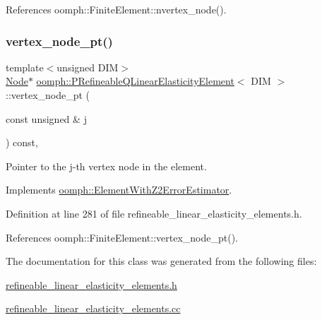 References oomph\+::\+Finite\+Element\+::nvertex\+\_\+node().

\mbox{\label{classoomph_1_1PRefineableQLinearElasticityElement_a0d55b987133d2b9a2f8be959e33ab7eb}} 
\subsubsection{\texorpdfstring{vertex\+\_\+node\+\_\+pt()}{vertex\_node\_pt()}}
{\footnotesize\ttfamily template$<$unsigned D\+IM$>$ \\
\hyperlink{classoomph_1_1Node}{Node}$\ast$ \hyperlink{classoomph_1_1PRefineableQLinearElasticityElement}{oomph\+::\+P\+Refineable\+Q\+Linear\+Elasticity\+Element}$<$ D\+IM $>$\+::vertex\+\_\+node\+\_\+pt (\begin{DoxyParamCaption}\item[{const unsigned \&}]{j }\end{DoxyParamCaption}) const\hspace{0.3cm}{\ttfamily [inline]}, {\ttfamily [virtual]}}



Pointer to the j-\/th vertex node in the element. 



Implements \hyperlink{classoomph_1_1ElementWithZ2ErrorEstimator_a0eedccc33519f852c5dc2055ddf2774b}{oomph\+::\+Element\+With\+Z2\+Error\+Estimator}.



Definition at line 281 of file refineable\+\_\+linear\+\_\+elasticity\+\_\+elements.\+h.



References oomph\+::\+Finite\+Element\+::vertex\+\_\+node\+\_\+pt().



The documentation for this class was generated from the following files\+:\begin{DoxyCompactItemize}
\item 
\hyperlink{refineable__linear__elasticity__elements_8h}{refineable\+\_\+linear\+\_\+elasticity\+\_\+elements.\+h}\item 
\hyperlink{refineable__linear__elasticity__elements_8cc}{refineable\+\_\+linear\+\_\+elasticity\+\_\+elements.\+cc}\end{DoxyCompactItemize}
